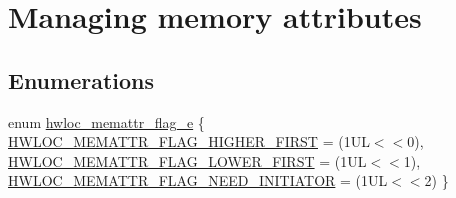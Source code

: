 \hypertarget{a00212}{}\section{Managing memory attributes}
\label{a00212}
\subsection*{Enumerations}
\begin{DoxyCompactItemize}
\item 
enum \hyperlink{a00212_ga78aceb4cac4d614c0f5e82dbfeb779e5}{hwloc\+\_\+memattr\+\_\+flag\+\_\+e} \{ \hyperlink{a00212_gga78aceb4cac4d614c0f5e82dbfeb779e5af29e65444a6ed00f5cc246df06f65815}{H\+W\+L\+O\+C\+\_\+\+M\+E\+M\+A\+T\+T\+R\+\_\+\+F\+L\+A\+G\+\_\+\+H\+I\+G\+H\+E\+R\+\_\+\+F\+I\+R\+ST} = (1\+UL$<$$<$0), 
\hyperlink{a00212_gga78aceb4cac4d614c0f5e82dbfeb779e5a9601b5b0e1e68635e7e9901f28bd93bf}{H\+W\+L\+O\+C\+\_\+\+M\+E\+M\+A\+T\+T\+R\+\_\+\+F\+L\+A\+G\+\_\+\+L\+O\+W\+E\+R\+\_\+\+F\+I\+R\+ST} = (1\+UL$<$$<$1), 
\hyperlink{a00212_gga78aceb4cac4d614c0f5e82dbfeb779e5a9d16523e285b2e22cfc78cc84dce8c96}{H\+W\+L\+O\+C\+\_\+\+M\+E\+M\+A\+T\+T\+R\+\_\+\+F\+L\+A\+G\+\_\+\+N\+E\+E\+D\+\_\+\+I\+N\+I\+T\+I\+A\+T\+OR} = (1\+UL$<$$<$2)
 \}
\end{DoxyCompactItemize}
